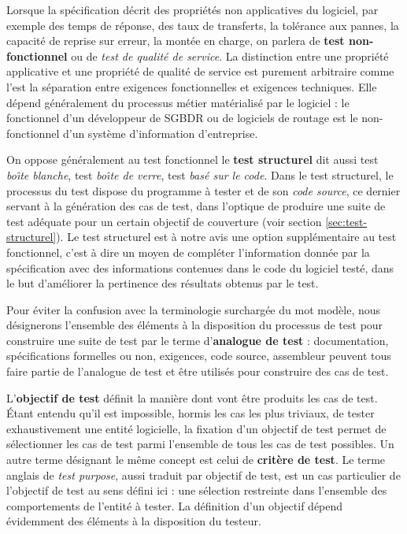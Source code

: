Lorsque la sp\'ecification d\'ecrit des propri\'et\'es non
applicatives du logiciel, par exemple des temps de r\'eponse, des
taux de transferts, la tol\'erance aux pannes, la capacit\'e de
reprise sur erreur, la mont\'ee en charge, on parlera de \textbf{test 
non-fonctionnel} ou de \emph{test de qualit\'e de service}. La distinction entre une propri\'et\'e applicative et une
propri\'et\'e de qualit\'e de service est purement arbitraire comme
l'est la s\'eparation entre exigences fonctionnelles et exigences
techniques.  Elle d\'epend g\'en\'eralement du processus m\'etier
mat\'erialis\'e par le logiciel : le fonctionnel d'un d\'eveloppeur
de \textsf{SGBDR} ou de logiciels de routage est le non-fonctionnel
d'un syst\`eme d'information d'entreprise.

On oppose g\'en\'eralement au test fonctionnel le \textbf{test
  structurel} dit aussi test \emph{bo\^{\i}te blanche}, test \emph{bo\^{\i}te de verre},
test \emph{bas\'e sur le code}. Dans le test
structurel, le processus du test dispose du programme \`a tester et
de son \emph{code source}, ce dernier servant \`a la
g\'en\'eration des cas de test, dans l'optique de produire une suite
de test ad\'equate pour un certain objectif de couverture (voir
section \ref{sec:test-structurel}). Le test structurel est \`a notre avis une option
suppl\'ementaire au test fonctionnel, c'est \`a dire un moyen de
compl\'eter l'information donn\'ee par la sp\'ecification avec des
informations contenues dans le code du logiciel test\'e, dans le but
  d'am\'eliorer la pertinence des r\'esultats obtenus par le test. 

Pour \'eviter la confusion avec la terminologie surcharg\'ee du mot mod\`ele, nous
d\'esignerons l'ensemble des \'el\'ements \`a la disposition du
processus de test pour construire une suite de test par le terme
d'\textbf{analogue de test} : documentation, sp\'ecifications formelles
ou non, exigences, code source, assembleur peuvent tous faire partie
de l'analogue de test et \^etre utilis\'es pour construire des cas
de test.

L'\textbf{objectif de test} d\'efinit la mani\`ere dont vont \^etre
produits les cas de test. \'Etant entendu qu'il est impossible,
hormis les cas les plus triviaux, de tester exhaustivement une
entit\'e logicielle, la fixation d'un objectif de test permet de
s\'electionner les cas de test parmi l'ensemble de tous les cas de
test possibles. Un autre terme d\'esignant le m\^eme concept est
celui de  \textbf{crit\`ere de test}. Le terme anglais de \emph{test
  purpose}, aussi traduit par objectif de test, est un cas particulier
de l'objectif de test au sens d\'efini ici : une s\'election
restreinte dans l'ensemble des comportements de l'entit\'e \`a
tester. La
d\'efinition d'un objectif d\'epend \'evidemment des \'el\'ements \`a la disposition du
testeur. 

